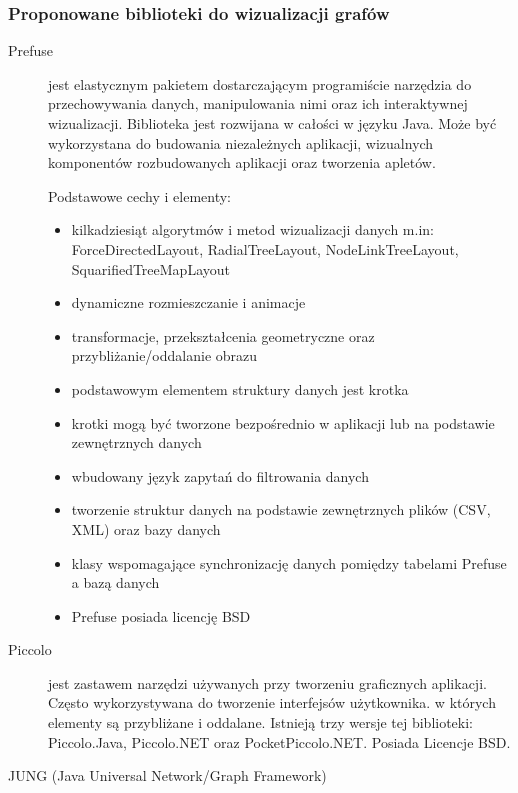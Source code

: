 	


	

	



\subsubsection{Proponowane biblioteki do wizualizacji grafów}


\begin{description}
\item[Prefuse]
 jest elastycznym pakietem dostarczającym programiście narzędzia do przechowywania danych, manipulowania nimi oraz ich interaktywnej wizualizacji. Biblioteka jest rozwijana w całości w języku Java. Może być wykorzystana do budowania niezależnych aplikacji, wizualnych komponentów rozbudowanych aplikacji oraz tworzenia apletów.


Podstawowe cechy i elementy:
\begin{itemize}
\item kilkadziesiąt algorytmów i metod wizualizacji danych m.in: ForceDirectedLayout, RadialTreeLayout, NodeLinkTreeLayout, SquarifiedTreeMapLayout
\item dynamiczne rozmieszczanie i animacje
\item transformacje, przekształcenia geometryczne oraz przybliżanie/oddalanie obrazu
\item podstawowym elementem struktury danych jest krotka
\item krotki mogą być tworzone bezpośrednio w aplikacji lub na podstawie zewnętrznych danych
\item wbudowany język zapytań do filtrowania danych
\item tworzenie struktur danych na podstawie zewnętrznych plików (CSV, XML) oraz bazy danych
\item klasy wspomagające synchronizację danych pomiędzy tabelami Prefuse a bazą danych
\item Prefuse posiada licencję BSD
\end{itemize}

 \item[Piccolo]  


 jest zastawem narzędzi używanych przy tworzeniu graficznych aplikacji. Często wykorzystywana do tworzenie interfejsów użytkownika. w których elementy są przybliżane i oddalane. Istnieją trzy wersje tej biblioteki: Piccolo.Java, Piccolo.NET oraz PocketPiccolo.NET. Posiada Licencje BSD.
\item[JUNG (Java Universal Network/Graph Framework)]


\end{description}
